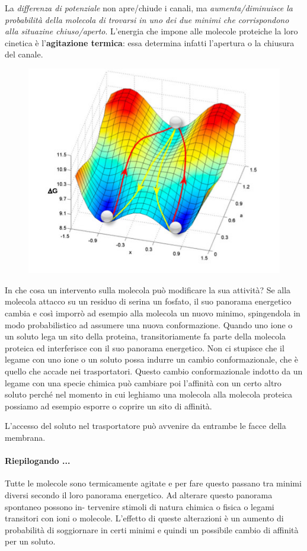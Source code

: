 \documentclass[a4paper,12pt]{article}
\begin{document}
La \emph{differenza di potenziale} non apre/chiude i  canali, ma \emph{aumenta/diminuisce la probabilità della molecola di trovarsi in uno dei due minimi che corrispondono alla situazine chiuso/aperto}.
L’energia che impone alle molecole proteiche la loro cinetica è l’\textbf{agitazione termica}: essa determina infatti
l'apertura o la chiusura del canale.
\begin{figure}[H]
\centering
\includegraphics[scale=0.5]{immagine/buca.jpg}
\end{figure}

In che cosa un intervento sulla molecola può modificare la sua attività? Se alla molecola attacco su un residuo di serina un fosfato, il suo panorama energetico cambia e così imporrò ad esempio alla molecola un nuovo minimo, spingendola in modo probabilistico ad assumere una nuova conformazione. Quando uno ione o un soluto lega un sito della proteina, transitoriamente fa parte della molecola proteica ed interferisce con il suo panorama energetico. Non ci stupisce che il legame con uno ione o un soluto possa indurre un cambio conformazionale, che è quello
che accade nei trasportatori. Questo cambio conformazionale indotto da un legame con
una specie chimica può cambiare poi l'affinità con un certo altro soluto perché nel momento in cui leghiamo una molecola alla molecola proteica possiamo ad esempio esporre o coprire un sito di affinità.

L'accesso del soluto nel trasportatore può avvenire da entrambe le facce della membrana.
\paragraph{Riepilogando ...}
Tutte le molecole sono termicamente agitate e per fare questo passano tra minimi diversi
secondo il loro panorama energetico. Ad alterare questo panorama spontaneo possono in-
tervenire stimoli di natura chimica o fisica o legami transitori con ioni o molecole.
L'effetto di queste alterazioni è un aumento di probabilità di soggiornare in certi minimi e
quindi un possibile cambio di affinità per un soluto.
\end{document}

